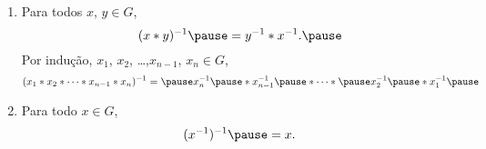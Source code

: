 \documentclass{beamer}
\begin{document}
    \begin{frame}
        \begin{proposicao}
            \begin{enumerate}[label={\roman*})]

                \conti

                \item Para todos $x$, $y \in G$,\pause
                \[
                    (x*y)^{-1} \pause = y^{-1}*x^{-1}.\pause
                \]
                Por indu{\c c}{\~a}o, \pause $x_1$, $x_2$, \dots ,$x_{n-1}$, $x_n \in G$,\pause
                \[
                    (x_1*x_2*\cdots *x_{n-1}*x_{n})^{-1} = \pause x^{-1}_{n}\pause *x^{-1}_{n-1}\pause *\cdots *\pause x^{-1}_2\pause *x^{-1}_1\pause
                \]
                \item Para todo $x \in G$, \pause
                \[
                    (x^{-1})^{-1} \pause = x.
                \]
            \end{enumerate}
        \end{proposicao}
    \end{frame}
\end{document}
